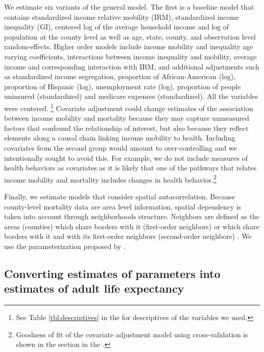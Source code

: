 \documentclass[11pt]{article}
\begin{document}
We estimate six variants of the general model. The first is a baseline model that contains standardized income relative mobility (IRM), standardized income inequality (GI), centered log of the average household income and log of population at the county level as well as age, state, county, and observation level random-effects. Higher order models include income mobility and inequality age varying coefficients, interactions between income inequality and mobility, average income and corresponding interaction with IRM, and additional adjustments such as standardized income segregation, proportion of African-American (log), proportion of Hispanic (log), unemployment rate (log), proportion of people uninsured (standardized) and medicare expenses (standardized). All the variables were centered. \footnote{See Table \ref{tbl:descriptives} in the  for descriptives of the variables we used.} Covariate adjustment could change estimates of the association between income mobility and mortality because they may capture unmeasured factors that confound the relationship of interest, but also because they reflect elements along a causal chain linking income mobility to health. Including covariates from the second group would amount to over-controlling and we intentionally sought to avoid this. For example, we do not include measures of health behaviors as covariates as it is likely that one of the pathways that relates income mobility and mortality includes changes in health behavior.\footnote{Goodness of fit of the covariate adjustment model using cross-validation is shown in the section \textit{} in the \textit{}.}

Finally, we estimate models that consider spatial autocorrelation. Because county-level mortality data are area level information, spatial dependency is taken into account through neighborhoods structure. Neighbors are defined as the areas (counties) which share borders with it (first-order neighbors) or which share borders with it and with its first-order neighbors (second-order neighbors) \citep{Blangiardo2015}. We use the parameterization proposed by \cite{Riebler2016}. 

\subsection{Converting estimates of parameters into estimates of adult life expectancy}
\end{document}
